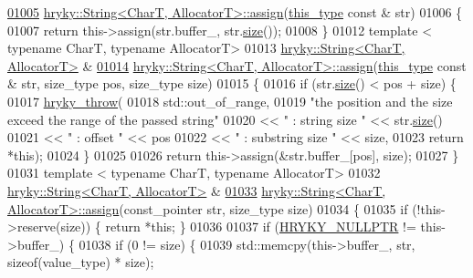\begin{DoxyCode}
\hypertarget{string_8h_source_l01005}{}\hyperlink{classhryky_1_1_string_a7bf5bd2385beb66a4d7d034eae00b9b1}{01005} \hyperlink{classhryky_1_1_string}{hryky::String<CharT, AllocatorT>::assign}(\hyperlink{classhryky_1_1_string}{this_type} \textcolor{keyword}{const} & str)
01006 \{
01007     \textcolor{keywordflow}{return} this->assign(str.buffer\_, str.\hyperlink{classhryky_1_1_string_a9db0f71dce7b2de86a54ab5323759265}{size}());
01008 \}
01012 \textcolor{keyword}{template} < \textcolor{keyword}{typename} CharT, \textcolor{keyword}{typename} AllocatorT>
01013 \hyperlink{classhryky_1_1_string}{hryky::String<CharT, AllocatorT>} &
\hypertarget{string_8h_source_l01014}{}\hyperlink{classhryky_1_1_string_a15549f6cd3f2a7957fc4d09d2ee1a346}{01014} \hyperlink{classhryky_1_1_string}{hryky::String<CharT, AllocatorT>::assign}(\hyperlink{classhryky_1_1_string}{this_type} \textcolor{keyword}{const} & str, size\_type pos, 
      size\_type size)
01015 \{
01016     \textcolor{keywordflow}{if} (str.\hyperlink{classhryky_1_1_string_a9db0f71dce7b2de86a54ab5323759265}{size}() < pos + size) \{
01017         \hyperlink{debug__common_8h_af50606eac4009921527ddcaed392b2c2}{hryky_throw}(
01018             std::out\_of\_range,
01019             \textcolor{stringliteral}{"the position and the size exceed the range of the passed string"}
01020             << \textcolor{stringliteral}{" : string size "} << str.\hyperlink{classhryky_1_1_string_a9db0f71dce7b2de86a54ab5323759265}{size}()
01021             << \textcolor{stringliteral}{" : offset "} << pos
01022             << \textcolor{stringliteral}{" : substring size "} << size,
01023             \textcolor{keywordflow}{return} *\textcolor{keyword}{this});
01024     \}
01025 
01026     \textcolor{keywordflow}{return} this->assign(&str.buffer\_[pos], size);
01027 \}
01031 \textcolor{keyword}{template} < \textcolor{keyword}{typename} CharT, \textcolor{keyword}{typename} AllocatorT>
01032 \hyperlink{classhryky_1_1_string}{hryky::String<CharT, AllocatorT>} &
\hypertarget{string_8h_source_l01033}{}\hyperlink{classhryky_1_1_string_a566ec0f2ab898625ae1a575a5b25c55a}{01033} \hyperlink{classhryky_1_1_string}{hryky::String<CharT, AllocatorT>::assign}(const\_pointer str, size\_type size)
01034 \{
01035     \textcolor{keywordflow}{if} (!this->reserve(size)) \{ \textcolor{keywordflow}{return} *\textcolor{keyword}{this}; \}
01036 
01037     \textcolor{keywordflow}{if} (\hyperlink{common_8h_a4cd4ac09cfcdbd6b30ee69afc156e210}{HRYKY_NULLPTR} != this->buffer\_) \{
01038         \textcolor{keywordflow}{if} (0 != size) \{
01039             std::memcpy(this->buffer\_, str, \textcolor{keyword}{sizeof}(value\_type) * size);

\end{DoxyCode}
